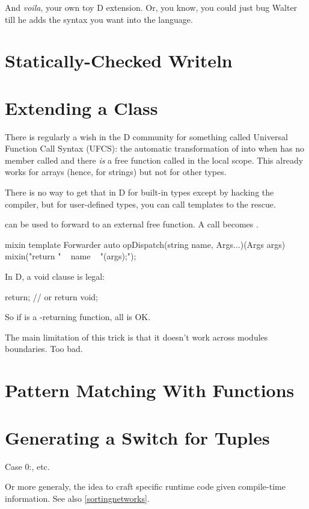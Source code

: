 And \emph{voila}, your own toy D extension. Or, you know, you could just bug Walter till he adds the syntax you want into the language.

\section{Statically-Checked Writeln}\label{staticallycheckedwriteln}


\section{Extending a Class}\label{extendingaclass}

There is regularly a wish in the D community for something called Universal Function Call Syntax (UFCS): the automatic transformation of  into  when  has no member called  and there \emph{is} a free function called  in the local scope. This already works for arrays (hence, for strings) but not for other types.

There is no way to get that in D for built-in types except by hacking the compiler, but for user-defined types, you can call templates to the rescue.

 can be used to forward to an external free function. A call  becomes .

\begin{dcode}
mixin template Forwarder
{
    auto opDispatch(string name, Args...)(Args args)
    {
        mixin("return " ~ name ~ "(args);");
    }
}
\end{dcode}

In D, a void  clause is legal: 

\begin{dcode}
return;
// or return void;
\end{dcode}

So if  is a -returning function, all is OK.

The main limitation of this trick is that it doesn't work across modules boundaries. Too bad.

\section{Pattern Matching With Functions}


\section{Generating a Switch for Tuples}
Case 0:, etc.

Or more generaly, the idea to craft specific runtime code given compile-time information.
See also \autoref{sortingnetworks}.
